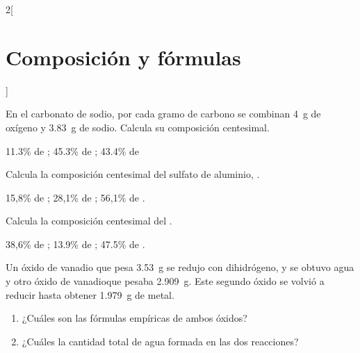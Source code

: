 \documentclass[10pt]{article}
\begin{document}
\begin{multicols}{2}[
  \section{Composición y fórmulas}
  ]
  \begin{exercise}[
      tags    = {termodinámica, entalpía, entalpia de reacción, calor},
      topics  = {química, termoquímica, termodinámica},
      source  = {FQ 1B SAN 2015, p43, e44},
    ]
    En el carbonato de sodio, por cada gramo de carbono se combinan \SI{4}{\gram} de oxígeno y \SI{3.83}{\gram} de sodio. Calcula su composición centesimal.
  \end{exercise}

  \begin{solution}
    11.3\% de ; 45.3\% de ; 43.4\% de 
  \end{solution}




  \begin{exercise}[
      tags    = {termodinámica, entalpía, entalpia de reacción, calor},
      topics  = {química, termoquímica, termodinámica},
      source  = {FQ 1B OXF 2015, p43, e42},
    ]
    Calcula la composición centesimal del sulfato de aluminio, .
  \end{exercise}

  \begin{solution}
    15,8\% de ; 28,1\% de ; 56,1\% de .
  \end{solution}



  \begin{exercise}[
      tags    = {termodinámica, entalpía, entalpia de reacción, calor},
      topics  = {química, termoquímica, termodinámica},
      source  = {FQ 1B OXF 2015, p43, e43},
    ]
    Calcula la composición centesimal del .
  \end{exercise}

  \begin{solution}
    38,6\% de ; 13.9\% de ; 47.5\% de .
  \end{solution}




  \begin{exercise}[
      tags    = {termodinámica, entalpía, entalpia de reacción, calor},
      topics  = {química, termoquímica, termodinámica},
      source  = {FQ 1B OXF 2015, p43, e45},
    ]
    Un óxido de vanadio que pesa \SI{3,53}{\gram} se redujo con dihidrógeno, y se obtuvo agua y otro óxido de vanadioque pesaba \SI{2,909}{\gram}. Este segundo óxido se volvió a reducir hasta obtener \SI{1,979}{\gram} de metal.
    \begin{enumerate}
      \item ¿Cuáles son las fórmulas empíricas de ambos óxidos?
      \item ¿Cuáles la cantidad total de agua formada en las dos reacciones?
    \end{enumerate}
  \end{exercise}


\end{multicols}
\end{document}

